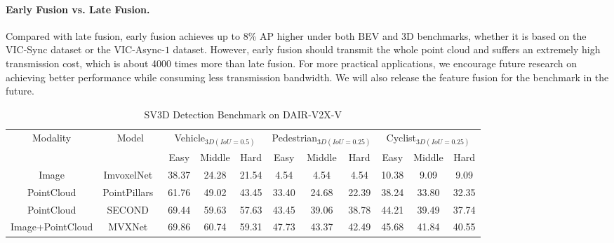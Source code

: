 \paragraph{Early Fusion vs. Late Fusion.} 
Compared with late fusion, early fusion achieves up to 8\% AP higher under both BEV and 3D benchmarks, whether it is based on the VIC-Sync dataset or the VIC-Async-$1$ dataset.
However, early fusion should transmit the whole point cloud and suffers an extremely high transmission cost, which is about 4000 times more than late fusion. 
For more practical applications, we encourage future research on achieving better performance while consuming less transmission bandwidth.
We will also release the feature fusion for the benchmark in the future.

\begin{table}[htpb!]
\centering
\caption{SV3D Detection Benchmark on DAIR-V2X-V}
\label{tab: SS3D-V}
\small
\begin{tabular}{cc|ccccccccc}
\hline\hline
\multirow{2}{*}{Modality} & 
\multirow{2}{*}{Model} & 
\multicolumn{3}{c}{Vehicle$_{3D(IoU=0.5)}$} & 
\multicolumn{3}{c}{Pedestrian$_{3D(IoU=0.25)}$} & 
\multicolumn{3}{c}{Cyclist$_{3D(IoU=0.25)}$} \\ \cline{3-11} &  
& Easy & \multicolumn{1}{c}{Middle} & \multicolumn{1}{c}{Hard} 
& Easy & \multicolumn{1}{c}{Middle} & \multicolumn{1}{c}{Hard} 
& Easy & \multicolumn{1}{c}{Middle} & \multicolumn{1}{c}{Hard} \\
\hline\hline
Image & ImvoxelNet~\cite{rukhovich2021imvoxelnet} & 38.37 & 24.28 & 21.54 & 4.54 & 4.54 & 4.54 & 10.38 & 9.09 & 9.09 \\
PointCloud & PointPillars~\cite{lang2019pointpillars} & 61.76 & 49.02 & 43.45 & 33.40 & 24.68 & 22.39 & 38.24 & 33.80 & 32.35 \\
PointCloud & SECOND~\cite{yan2018second} & 69.44 & 59.63 & 57.63 & 43.45 & 39.06 & 38.78 & 44.21 & 39.49 & 37.74 \\
Image+PointCloud & MVXNet~\cite{Sindagi2019MVX} & 69.86 & 60.74 & 59.31 & 47.73 & 43.37 & 42.49 & 45.68 & 41.84 & 40.55 \\

\hline\hline
\end{tabular}
\end{table}

